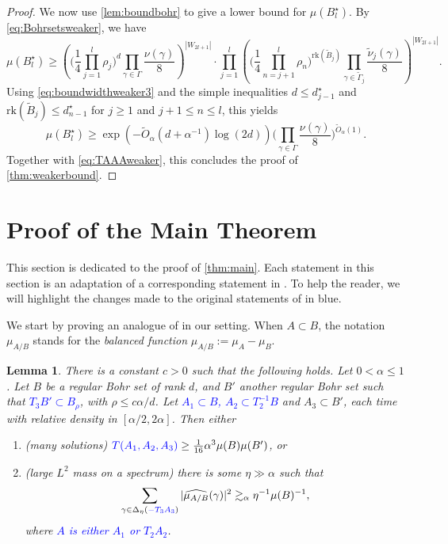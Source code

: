 \documentclass{daj}
\newtheorem{lemma}[theorem]{Lemma}
\theoremstyle{definition}
\newcommand{\m}[1]{\mu_{#1}}
\newcommand{\mh}[1]{\widehat{\mu_{#1}}}
\newcommand{\blue}[1]{\textcolor{blue}{#1}}
\begin{document}
\begin{proof}
We now use \cref{lem:boundbohr} to give a lower bound for $\mu(B_l^{\star})$. By \cref{eq:Bohrsetsweaker}, we have 
\begin{equation*}
\mu(B_l^{\star}) \geq \left(\Bigg(\frac{1}{4}\prod_{j=1}^{l} \rho_j\Bigg)^d\prod_{\gamma\in \Gamma} \frac{\nu(\gamma)}{8}\right)^{|W_{2l+1}|} \cdot \prod_{j=1}^{l}\left( \Bigg(\frac{1}{4}\prod_{n=j+1}^{l} \rho_n\Bigg)^{\mathrm{rk}(\widetilde{B}_j)}\prod_{\gamma\in \widetilde{\Gamma}_j} \frac{\widetilde{\nu}_j(\gamma)}{8}\right)^{|W_{2l+1}|}.
\end{equation*}
Using \cref{eq:boundwidthweaker3} and the simple inequalities $d\leq d_{j-1}^{\star}$ and $\mathrm{rk}(\widetilde{B}_j) \leq d_{n-1}^{\star}$ for $j\geq 1$ and $j+1\leq n\leq l$, this yields
\begin{equation*}
\mu(B_l^{\star}) \geq  \exp \left( -\tilde{O}_{\alpha} \left(d+\alpha^{-1}\right)\log (2d) \right) \Bigg(\prod_{\gamma\in \Gamma} \frac{\nu(\gamma)}{8}\Bigg)^{\tilde{O}_{\alpha}(1)}.
\end{equation*}
Together with \cref{eq:TAAAweaker}, this concludes the proof of \cref{thm:weakerbound}.
\end{proof}







\section{Proof of the Main Theorem}
\label{sec:pfmain}

This section is dedicated to the proof of \cref{thm:main}. Each statement in this section is an adaptation of a corresponding statement in \cite{BS}. To help the reader, we will highlight the changes made to the original statements of \cite{BS} in blue.

We start by proving an analogue of \cite[Lemma~8.2]{BS} in our setting. When $A \subset B$, the notation $\m{A/B}$ stands for the \emph{balanced function} $\m{A/B} := \m{A} - \m{B}$.

\begin{lemma}
\label{lem:progressions}
There is a constant $c > 0$ such that the following holds. Let $0 < \alpha \leq 1$. Let $B$ be a regular Bohr set of rank $d$, and $B'$ another regular Bohr set such that \blue{$T_3B' \subset B_{\rho}$}, with $\rho \leq c\alpha/d$. Let \blue{$A_1 \subset B$, $A_2\subset T_2^{-1}B$} and $A_3 \subset B'$, each time with relative density in $[\alpha/2, 2\alpha]$. Then either 
\begin{enumerate}
	\item (many solutions) $\blue{T(A_1, A_2, A_3)} \geq \tfrac{1}{16} \alpha^3 \mu(B) \mu(B')$, or
	\item (large $L^2$ mass on a spectrum) there is some $\eta \gg \alpha$ such that
	\begin{equation*}
	\sum_{\gamma \in \Delta_\eta (\blue{-T_3A_3})} |\mh{A/B}(\gamma)|^2 \gtrsim_{\alpha} \eta^{-1} \mu(B)^{-1},
	\end{equation*}
	where \blue{$A$ is either $A_1$ or $T_2A_2$}.
\end{enumerate}
\end{lemma}
\end{document}
